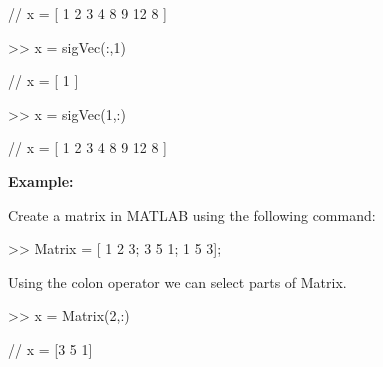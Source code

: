 \documentclass[11pt]{article}
\begin{document}
\begin{center}


// x  = [ 1 2 3 4 8 9 12 8 ] 


\end{center}

\vspace{4mm}

\begin{center}

>> x = sigVec(:,1)



\end{center}

\begin{center}


// x  = [ 1  ] 


\end{center}

\begin{center}

>> x = sigVec(1,:)



\end{center}

\begin{center}


// x  = [ 1 2 3 4 8 9 12 8 ] 


\end{center}


\textbf{Example:} 

Create a matrix in MATLAB using the following command:
\begin{center}


>> Matrix = [ 1 2 3; 3 5 1; 1 5 3];


\end{center}


\vspace{4mm}

Using the colon operator we can select parts of Matrix.

\vspace{4mm}

\begin{center}

>> x = Matrix(2,:)



\end{center}

\begin{center}


// x  =  [3 5 1]

\end{center}
\end{document}
